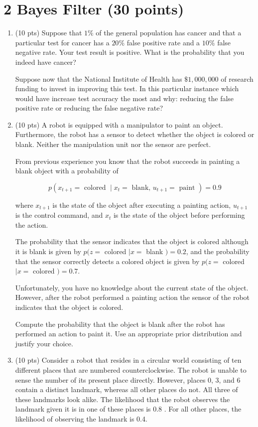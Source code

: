 \documentclass{article}
\theoremstyle{definition}
\begin{document}
\section*{2 Bayes Filter (30 points)}
\begin{enumerate}[label=\Alph*.]
\item (10 pts) Suppose that $1 \%$ of the general population has cancer and that a particular test for cancer has a $20 \%$ false positive rate and a $10 \%$ false negative rate. Your test result is positive. What is the probability that you indeed have cancer?

Suppose now that the National Institute of Health has $\$ 1,000,000$ of research funding to invest in improving this test. In this particular instance which would have increase test accuracy the most and why: reducing the false positive rate or reducing the false negative rate?

\item (10 pts) A robot is equipped with a manipulator to paint an object. Furthermore, the robot has a sensor to detect whether the object is colored or blank. Neither the manipulation unit nor the sensor are perfect.

From previous experience you know that the robot succeeds in painting a blank object with a probability of

$$
p\left(x_{t+1}=\text { colored } \mid x_{t}=\text { blank, } u_{t+1}=\text { paint }\right)=0.9
$$

where $x_{t+1}$ is the state of the object after executing a painting action, $u_{t+1}$ is the control command, and $x_{t}$ is the state of the object before performing the action.

The probability that the sensor indicates that the object is colored although it is blank is given by $p(z=$ colored $\mid x=$ blank $)=0.2$, and the probability that the sensor correctly detects a colored object is given by $p(z=$ colored $\mid x=$ colored $)=0.7$.

Unfortunately, you have no knowledge about the current state of the object. However, after the robot performed a painting action the sensor of the robot indicates that the object is colored.

Compute the probability that the object is blank after the robot has performed an action to paint it. Use an appropriate prior distribution and justify your choice.

\item (10 pts) Consider a robot that resides in a circular world consisting of ten different places that are numbered counterclockwise. The robot is unable to sense the number of its present place directly. However, places 0, 3, and 6 contain a distinct landmark, whereas all other places do not. All three of these landmarks look alike. The likelihood that the robot observes the landmark given it is in one of these places is 0.8 . For all other places, the likelihood of observing the landmark is 0.4.


\end{enumerate}
\end{document}
